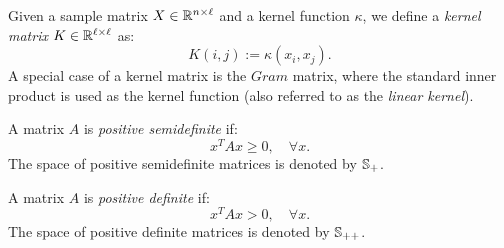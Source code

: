 \begin{definition}\label{def:notation:kernel_matrix}
Given a sample matrix $X \in \mathbb{R}^{n\times\ell}$ and a kernel function $\kappa$, we define a \emph{kernel matrix} $K \in \mathbb{R}^{\ell \times \ell}$ as:
$$ K(i,j) := \kappa(x_i, x_j).$$
A special case of a kernel matrix is the $Gram$ matrix, where the standard inner product is used as the kernel function (also referred to as the \emph{linear kernel}).
\end{definition}

\begin{definition}\label{def:notation:positive_semidefinite}
A matrix $A$ is \emph{positive semidefinite} if:
$$ x^T A x \geq 0,\quad \forall x.$$
The space of positive semidefinite matrices is denoted by $\mathbb{S}_+$.
\end{definition}

\begin{definition}\label{def:notation:positive_semidefinite}
A matrix $A$ is \emph{positive definite} if:
$$ x^T A x > 0,\quad \forall x.$$
The space of positive definite matrices is denoted by $\mathbb{S}_{++}$.
\end{definition}